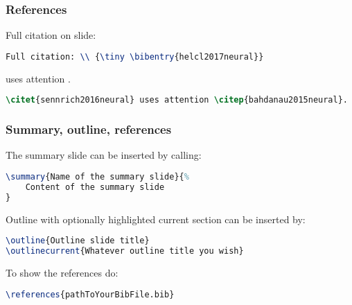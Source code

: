 \documentclass[handout,aspectratio=169]{beamer}
\begin{document}
\begin{frame}[fragile]
    \frametitle{References}

    Full citation on slide: \\ {\tiny {}}

\begin{lstlisting}[language=TeX]
Full citation: \\ {\tiny \bibentry{helcl2017neural}}
\end{lstlisting}

    \citet{sennrich2016neural} uses attention \citep{bahdanau2015neural}.

    \begin{lstlisting}[language=TeX]
\citet{sennrich2016neural} uses attention \citep{bahdanau2015neural}.
    \end{lstlisting}

    \tiny
    \citet{snover2006study,lu2016knowing,tu2016modeling,feng2016improving,zhang2016recurrent,alkhouli2016alignment,graves2014neural,specia2016shared,elliott2016multi30k}

\end{frame}


\begin{frame}[fragile]
    \frametitle{Summary, outline, references}

    The summary slide can be inserted by calling:

    \begin{lstlisting}[language=TeX]
\summary{Name of the summary slide}{%
    Content of the summary slide
}
    \end{lstlisting}

    Outline with optionally highlighted current section can be inserted by:
    \begin{lstlisting}[language=TeX]
\outline{Outline slide title}
\outlinecurrent{Whatever outline title you wish}
    \end{lstlisting}

    To show the references do:

    \begin{lstlisting}[language=TeX]
\references{pathToYourBibFile.bib}
    \end{lstlisting}

\end{frame}

\end{document}
